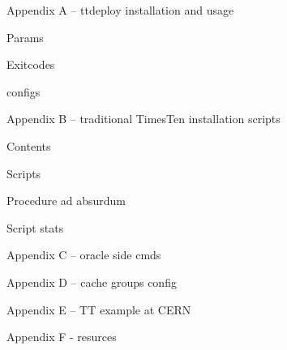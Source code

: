 \documentclass[11pt, letterpaper]{article}            %
\begin{document}
Appendix A – ttdeploy installation and usage

Params

Exitcodes

configs

Appendix B – traditional TimesTen installation scripts

                Contents

                Scripts

                Procedure ad absurdum

                Script stats

Appendix C – oracle side cmds

Appendix D – cache groups config

Appendix E – TT example at CERN

Appendix F - resurces




\newpage
{}

\end{document}
